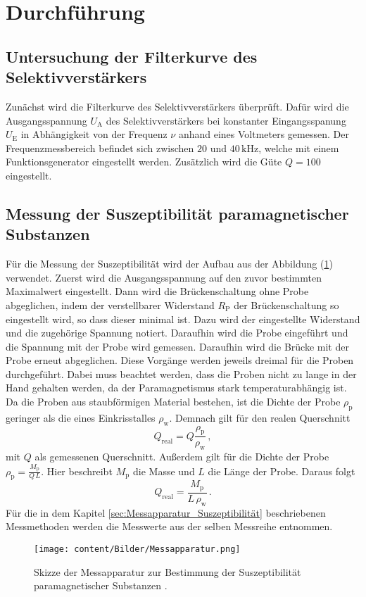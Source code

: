 \section{Durchführung}
\label{sec:Durchführung}
\subsection{Untersuchung der Filterkurve des Selektivverstärkers}
Zunächst wird die Filterkurve des Selektivverstärkers überprüft. Dafür wird die Ausgangsspannung $U_{\text{A}}$ des Selektivverstärkers bei 
konstanter Eingangsspanung $U_{\text{E}}$  in Abhängigkeit von der Frequenz $\nu$ anhand eines Voltmeters gemessen. Der Frequenzmessbereich befindet sich zwischen
$20$ und $40\,\unit{\kilo\hertz}$, welche mit einem Funktionsgenerator eingestellt werden. Zusätzlich wird die Güte $Q=100$ eingestellt.

\subsection{Messung der Suszeptibilität paramagnetischer Substanzen}
Für die Messung der Suszeptibilität wird der Aufbau aus der Abbildung (\ref{fig:Messapparatur}) verwendet. Zuerst wird die Ausgangsspannung
auf den zuvor bestimmten Maximalwert eingestellt. Dann wird die Brückenschaltung ohne Probe abgeglichen, indem der verstellbarer Widerstand $R_{\text{P}}$
der Brückenschaltung so eingestellt wird, so dass dieser minimal ist. Dazu wird der eingestellte Widerstand und die zugehörige Spannung notiert. Daraufhin 
wird die Probe eingeführt und die Spannung mit der Probe wird gemessen. Daraufhin wird die Brücke mit der Probe erneut abgeglichen. Diese Vorgänge werden jeweils
dreimal für die Proben durchgeführt. Dabei muss beachtet werden, dass die Proben nicht zu lange in der Hand gehalten werden, da der Paramagnetismus stark temperaturabhängig ist.
Da die Proben aus staubförmigen Material bestehen, ist die Dichte der Probe $\rho _{\text{p}}$ geringer als die eines Einkrisstalles $\rho _{\text{w}}$. Demnach gilt für den realen Querschnitt 
\begin{equation}
    Q_{\text{real}}= Q \frac{\rho_{\text{p}}}{\rho_{\text{w}}}\,,
    \label{eqn:Querschnitt}
\end{equation}
mit $Q$ als gemessenen Querschnitt. Außerdem gilt für die Dichte der Probe $\rho_{\text{p}} = \frac{M_{\text{p}}}{Q\, L}$. Hier beschreibt $M_{\text{p}}$  die Masse und
$L$ die Länge der Probe. Daraus folgt
\begin{equation}
    Q_{\text{real}}= \frac{M_{\text{p}}}{L\,\rho_{\text{w}}}\,.
    \label{eqn:Querschnitt_Real}
\end{equation}
Für die in dem Kapitel \ref{sec:Messapparatur_Suszeptibilität}
beschriebenen Messmethoden werden die Messwerte aus der selben Messreihe entnommen. 
\begin{figure}[H]
    \centering
    \texttt{[image: content/Bilder/Messapparatur.png]}
    \caption{Skizze der Messapparatur zur Bestimmung der Suszeptibilität paramagnetischer Substanzen \cite{anleitungV606}.}
    \label{fig:Messapparatur}
\end{figure} 